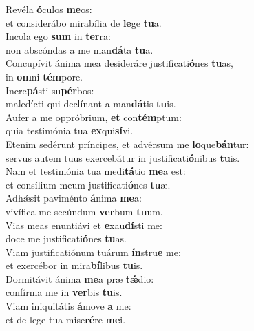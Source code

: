 \evenverse Revéla \textbf{ó}culos \textbf{me}os:~\*\\
\evenverse et considerábo mirabília de \textbf{le}ge \textbf{tu}a.\\
\oddverse Incola ego \textbf{sum} in \textbf{ter}ra:~\*\\
\oddverse non abscóndas a me man\textbf{dá}ta \textbf{tu}a.\\
\evenverse Concupívit ánima mea desideráre justificati\textbf{ó}nes \textbf{tu}as,~\*\\
\evenverse in \textbf{om}ni \textbf{tém}pore.\\
\oddverse Incre\textbf{pá}sti su\textbf{pér}bos:~\*\\
\oddverse maledícti qui declínant a man\textbf{dá}tis \textbf{tu}is.\\
\evenverse Aufer a me oppróbrium, \textbf{et} con\textbf{tém}ptum:~\*\\
\evenverse quia testimónia tua \textbf{ex}qui\textbf{sí}vi.\\
\oddverse Etenim sedérunt príncipes, et advérsum me \textbf{lo}que\textbf{bán}tur:~\*\\
\oddverse servus autem tuus exercebátur in justificati\textbf{ó}nibus \textbf{tu}is.\\
\evenverse Nam et testimónia tua medi\textbf{tá}tio \textbf{me}a est:~\*\\
\evenverse et consílium meum justificati\textbf{ó}nes \textbf{tu}æ.\\
\oddverse Adhǽsit paviménto \textbf{á}nima \textbf{me}a:~\*\\
\oddverse vivífica me secúndum \textbf{ver}bum \textbf{tu}um.\\
\evenverse Vias meas enuntiávi et \textbf{e}xau\textbf{dí}sti me:~\*\\
\evenverse doce me justificati\textbf{ó}nes \textbf{tu}as.\\
\oddverse Viam justificatiónum tuárum \textbf{ín}stru\textbf{e} me:~\*\\
\oddverse et exercébor in mira\textbf{bí}libus \textbf{tu}is.\\
\evenverse Dormitávit ánima \textbf{me}a præ \textbf{tǽ}dio:~\*\\
\evenverse confírma me in \textbf{ver}bis \textbf{tu}is.\\
\oddverse Viam iniquitátis \textbf{á}move \textbf{a} me:~\*\\
\oddverse et de lege tua mise\textbf{ré}re \textbf{me}i.\\
